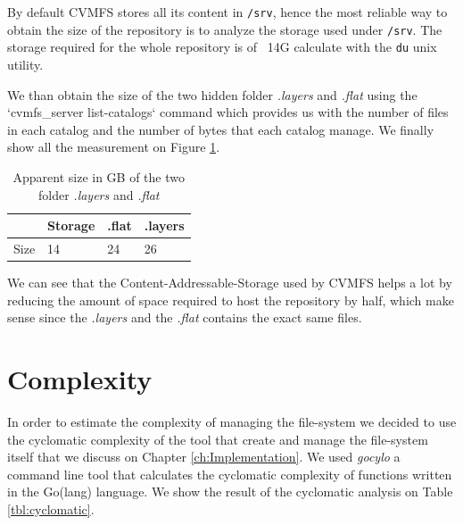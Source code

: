 By default CVMFS stores all its content in \texttt{/srv}, hence the most
reliable way to obtain the size of the repository is to analyze the storage
used under \texttt{/srv}. The storage required for the whole repository is of
~14G calculate with the \texttt{du} unix utility.

We than obtain the size of the two hidden folder \textit{.layers} and
\textit{.flat} using the `cvmfs\_server list-catalogs` command which provides us
with the number of files in each catalog and the number of bytes that each
catalog manage. We finally show all the measurement on Figure \ref{tab:size-of-repo}.

\begin{table}[]
\begin{center}
\begin{tabular}{|l|lll|}
\hline
        & Storage & .flat & .layers \\ \hline
        Size & 14 & 24    & 26      \\ \hline
\end{tabular}
\end{center}
\caption{Apparent size in GB of the two folder \textit{.layers} and \textit{.flat}}
\label{tab:size-of-repo}
\end{table}

We can see that the Content-Addressable-Storage used by CVMFS helps a lot by
reducing the amount of space required to host the repository by half, which
make sense since the \textit{.layers} and the \textit{.flat} contains the exact
same files.

\section{Complexity}

In order to estimate the complexity of managing the file-system we decided to
use the cyclomatic complexity of the tool that create and manage the
file-system itself that we discuss on Chapter \ref{ch:Implementation}. We used
\textit{gocylo} \cite{gocyclo} a command line tool that calculates the
cyclomatic complexity of functions written in the Go(lang) language. We show
the result of the cyclomatic analysis on Table \ref{tbl:cyclomatic}.


